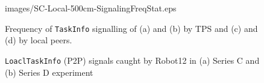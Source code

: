 \documentclass[final,5p,times,twocolumn]{elsarticle}
\begin{document}
\begin{figure}
{{images/SC-Local-500cm-SignalingFreqStat.eps}}
\newline
{}
\newline
\caption{Frequency of \texttt{TaskInfo} signalling of (a) and (b) by TPS and (c) and (d) by local peers.}
\end{figure}
\begin{figure}
\label{fig:local-single-robot-signal}
\begin{centering}
\newline
{}
\newline
\caption{\small \texttt{LoaclTaskInfo} (P2P) signals caught by Robot12 in (a) Series C and (b) Series D experiment}
\end{centering}
\end{figure}
\end{document}
